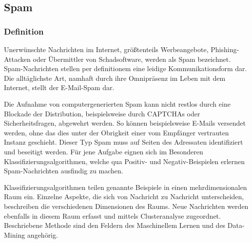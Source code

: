 \subsection{Spam} %
\label{sub:spam}
\subsubsection{Definition} %
\label{ssub:definition}
Unerwünschte Nachrichten im Internet, größtenteils Werbeangebote, Phishing-Attacken oder Übermittler von Schadsoftware, werden als Spam bezeichnet. Spam-Nachrichten stellen per definitionem eine leidige Kommunikationsform dar. Die alltäglichste Art, namhaft durch ihre Omnipräsenz im Leben mit dem Internet, stellt der E-Mail-Spam dar.

Die Aufnahme von computergenerierten Spam kann nicht restlos durch eine Blockade der Distribution, beispielsweise durch CAPTCHAs oder Sicherheitsfragen, abgewehrt werden. So können beispielsweise E-Mails versendet werden, ohne das dies unter der Obrigkeit einer vom Empfänger vertrauten Instanz geschieht. Dieser Typ Spam muss auf Seiten des Adressaten identifiziert und beseitigt werden. Für jene Aufgabe eignen sich im Besonderen Klassifizierungsalgorithmen, welche qua Positiv- und Negativ-Beispielen erlernen Spam-Nachrichten ausfindig zu machen.

Klassifizierungsalgorithmen teilen genannte Beispiele in einen mehrdimensionalen Raum ein. Einzelne Aspekte, die sich von Nachricht zu Nachricht unterscheiden, beschreiben die verschiedenen Dimensionen des Raums. Neue Nachrichten werden ebenfalls in diesem Raum erfasst und mittels Clusteranalyse zugeordnet. Beschriebene Methode sind den Feldern des Maschinellem Lernen und des Data-Mining angehörig.

